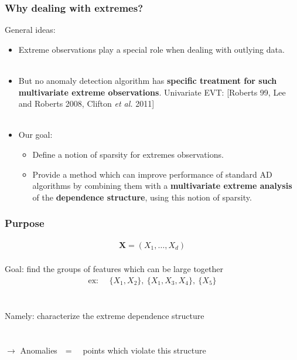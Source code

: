 \documentclass[9pt]{beamer}
\def\mb{\mathbf}
\begin{document}
\begin{frame}
\frametitle{Why dealing with extremes?}
\begin{alertblock}{General ideas:}
\begin{itemize}
\item Extreme observations play a special role when dealing with outlying data.\\~\\
\item But no anomaly detection algorithm has \textbf{specific treatment for such multivariate extreme observations}. Univariate EVT: [Roberts 99, Lee and Roberts 2008, Clifton \emph{et al.} 2011]\\~\\
\item Our goal:
  \begin{itemize}
  \item Define a notion of sparsity for extremes observations.
  \item Provide a method which can improve performance of standard AD algorithms by combining them with a \textbf{multivariate extreme analysis} of the \textbf{dependence structure}, using this notion of sparsity.
  \end{itemize}
\end{itemize}
\end{alertblock}
\end{frame}



\begin{frame}
\frametitle{Purpose}
\noindent
\begin{align*}
\mb X = (X_1,\ldots,X_d)
\end{align*}
~\\
{\large Goal: find the groups of features which can be large together}
\begin{align*}
\text{ex:~~~~}\{X_1, X_2\},~\{X_1, X_3, X_4\},~\{X_5\}
\end{align*}
~\\~\\
{\large Namely: characterize the extreme dependence structure\\~\\~\\

$\to$ Anomalies~~=~~ points which violate this structure
}
\end{frame}
\end{document}
